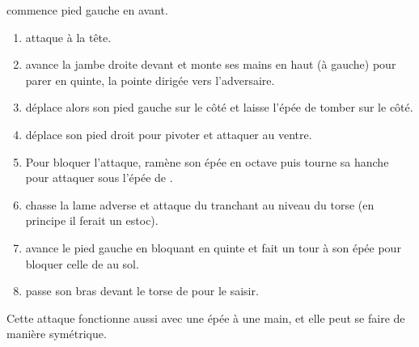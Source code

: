 \begin{technique}

\D commence pied gauche en avant.

\begin{enumerate}
	\item \A attaque à la tête.
	
	\item \D avance la jambe droite devant et monte ses mains en haut (à gauche) pour parer en quinte, la pointe dirigée vers l'adversaire.
	
	\item \D déplace alors son pied gauche sur le côté et laisse l'épée de \A tomber sur le côté.
	
	\item \D déplace son pied droit pour pivoter et attaquer au ventre.
	
	\item Pour bloquer l'attaque, \A ramène son épée en octave puis tourne sa hanche pour attaquer sous l'épée de \D.
	
	\item \D chasse la lame adverse et attaque du tranchant au niveau du torse (en principe il ferait un estoc).
	
	\item \A avance le pied gauche en bloquant en quinte et fait un tour à son épée pour bloquer celle de \D au sol.
	
	\item \A passe son bras devant le torse de \D pour le saisir.
\end{enumerate}

Cette attaque fonctionne aussi avec une épée à une main, et elle peut se faire de manière symétrique.
\end{technique}


